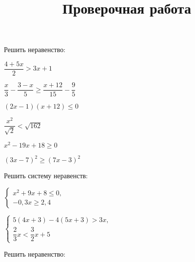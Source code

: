 \begin{listofex}
	\item {}
	\item Решить неравенство:
	\begin{enumcols}[itemcolumns=2]
		\item \( \dfrac{4+5x}{2}>3x+1 \) 
		\item \( \dfrac{x}{3}-\dfrac{3-x}{5}\ge\dfrac{x+12}{15}-\dfrac{9}{5} \) \answer{\( [-\dfrac{6}{7};+\infty) \)}
		\item \( (2x-1)(x+12)\le0 \) \answer{\( [-12;0,5] \)}
		\item \( \dfrac{x^2}{\sqrt{2}}<\sqrt{162} \) 
		\item \( x^2-19x+18\ge0 \) \answer{\( (-\infty;1]\cup[18;+\infty) \)}
		\item \( (3x-7)^2\ge(7x-3)^2 \) \answer{\( [-1;1] \)}
	\end{enumcols}
	\item Решить систему неравенств:
	\begin{enumcols}[itemcolumns=2]
		\item \( \left\{
		\begin{array}{l}
			x^2+9x+8\le0,\\
			-0,3x\ge2,4
		\end{array}
		\right. \) 
		\item \( \left\{
		\begin{array}{l}
			5(4x+3)-4(5x+3)>3x,\\
			\dfrac{2}{3}x<\dfrac{3}{2}x+5
		\end{array}
		\right. \) 
	\end{enumcols}
	\item {}
	\item Решить неравенство:
	\begin{enumcols}[itemcolumns=2]
		\item {}
		\item {}
	\end{enumcols}
\end{listofex}
%	
\newpage
\title{Проверочная работа}
